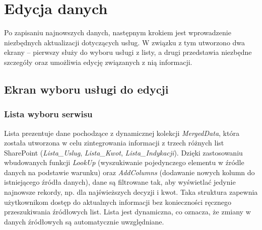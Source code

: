 \section{Edycja danych}

Po zapisaniu najnowszych danych, następnym krokiem jest wprowadzenie niezbędnych aktualizacji dotyczących usług. W związku z tym utworzono dwa ekrany -- pierwszy służy do wyboru usługi z listy, a drugi przedstawia niezbędne szczegóły oraz umożliwia edycję związanych z nią informacji.

\subsection{Ekran wyboru usługi do edycji}

\begin{comment}

Ekran wyboru elementu do obróbki składa się z: \begin{enumerate}
    \item listy, przedstawiającej dane z tymczasowej kolekcji \textit{MergedData}, utworzonej specjalnie na potrzeby obsługi wyboru danych do edycji,
    \item pól wyszukiwania i filtrów, umożliwiających zawężenie listy na podstawie nazwy usługi, identyfikatora (\textit{Service ID}), miejsca powstawania kosztów (\textit{MPK}) oraz statusu decyzji (\textit{Accepted}, \textit{Not Accepted}, \textit{No Status}),
    \item wykresu kołowego, prezentującego wizualne podsumowanie liczby elementów w każdej kategorii statusu decyzji,
    \item interfejsu umożliwiającego dynamiczne dopasowanie wyników listy w czasie rzeczywistym, na podstawie wprowadzonych kryteriów wyszukiwania,
    \item nagłówka, który przedstawia kontekst użytkownika, w tym nazwę i dane aktualnie zalogowanego użytkownika. \end{enumerate}
\end{comment}

\subsubsection*{Lista wyboru serwisu}
Lista prezentuje dane pochodzące z dynamicznej kolekcji \textit{MergedData}, która została utworzona w celu zintegrowania informacji z trzech różnych list SharePoint (\textit{Lista\_Uslug}, \textit{Lista\_Kwot}, \textit{Lista\_Indykacji}). Dzięki zastosowaniu wbudowanych funkcji \textit{LookUp} (wyszukiwanie pojedynczego elementu w źródle danych na podstawie warunku) oraz \textit{AddColumns} (dodawanie nowych kolumn do istniejącego źródła danych), dane są filtrowane tak, aby wyświetlać jedynie najnowsze rekordy, np. dla najświeższych decyzji i kwot. Taka struktura zapewnia użytkownikom dostęp do aktualnych informacji bez konieczności ręcznego przeszukiwania źródłowych list. Lista jest dynamiczna, co oznacza, że zmiany w danych źródłowych są automatycznie uwzględniane.

